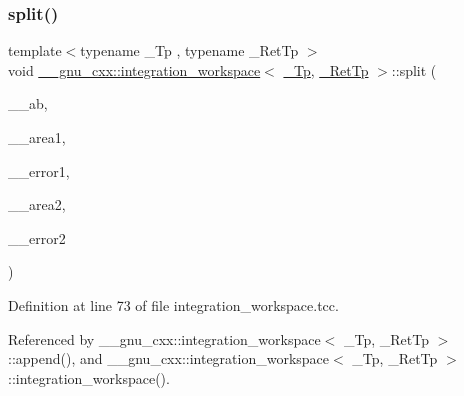 \subsubsection{\texorpdfstring{split()}{split()}}
{\footnotesize\ttfamily template$<$typename \+\_\+\+Tp , typename \+\_\+\+Ret\+Tp $>$ \\
void \hyperlink{class____gnu__cxx_1_1integration__workspace}{\+\_\+\+\_\+gnu\+\_\+cxx\+::integration\+\_\+workspace}$<$ \hyperlink{namespace____gnu__cxx_a3b19a9c800ca194374ef9172290f7d79}{\+\_\+\+Tp}, \hyperlink{namespace____gnu__cxx_a886e03ece3d53ff7fa6c098a40f93fa5}{\+\_\+\+Ret\+Tp} $>$\+::split (\begin{DoxyParamCaption}\item[{\hyperlink{namespace____gnu__cxx_a3b19a9c800ca194374ef9172290f7d79}{\+\_\+\+Tp}}]{\+\_\+\+\_\+ab,  }\item[{\+\_\+\+Area\+Tp}]{\+\_\+\+\_\+area1,  }\item[{\+\_\+\+Error\+Tp}]{\+\_\+\+\_\+error1,  }\item[{\+\_\+\+Area\+Tp}]{\+\_\+\+\_\+area2,  }\item[{\+\_\+\+Error\+Tp}]{\+\_\+\+\_\+error2 }\end{DoxyParamCaption})}



Definition at line 73 of file integration\+\_\+workspace.\+tcc.



Referenced by \+\_\+\+\_\+gnu\+\_\+cxx\+::integration\+\_\+workspace$<$ \+\_\+\+Tp, \+\_\+\+Ret\+Tp $>$\+::append(), and \+\_\+\+\_\+gnu\+\_\+cxx\+::integration\+\_\+workspace$<$ \+\_\+\+Tp, \+\_\+\+Ret\+Tp $>$\+::integration\+\_\+workspace().


